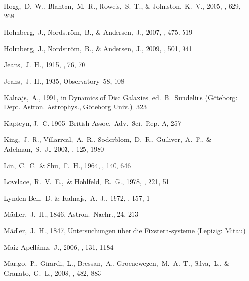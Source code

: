 \begin{thebibliography}{99}
  Hogg,~D.~W., Blanton,~M.~R., Roweis,~S.~T., \& Johnston,~K.~V., 2005,
  \apj, 629, 268

  Holmberg,~J., Nordstr\"{o}m,~B., \& Andersen,~J., 2007,
  \aap, 475, 519

  Holmberg,~J., Nordstr\"{o}m,~B., \& Andersen,~J., 2009,
  \aap, 501, 941

  Jeans,~J.~H., 1915,
  \mnras, 76, 70

  Jeans,~J.~H., 1935,
  Observatory, 58, 108

  Kalnajs,~A., 1991, in Dynamics of Disc Galaxies, ed.~B.~Sundelius (G\"{o}teborg: Dept. Astron. Astrophys., G\"{o}teborg Univ.), 323

{Kapteyn}, J.~C. 1905, {British Assoc.~Adv.~Sci.~Rep.} A, 257

  King,~J.~R., Villarreal,~A.~R., Soderblom,~D.~R., Gulliver,~A.~F., \& Adelman,~S.~J., 2003,
  \aj, 125, 1980

  Lin,~C.~C.~\& Shu,~F.~H., 1964,
  \apj, 140, 646

  Lovelace,~R.~V.~E.,~\& Hohlfeld,~R.~G., 1978,
  \apj, 221, 51

  Lynden-Bell,~D. \& Kalnajs,~A.~J., 1972,
  \mnras, 157, 1

  M\"{a}dler,~J.~H., 1846, Astron.~Nachr., 24, 213

  M\"{a}dler,~J.~H., 1847, Untersuchungen \"{u}ber die Fixstern-systeme (Lepizig: Mitau)

  Ma{\'{\i}}z Apell{\'a}niz,~J., 2006,
  \aj, 131, 1184

  Marigo,~P., Girardi,~L., Bressan,~A., Groenewegen,~M.~A.~T., Silva,~L., \& Granato,~G.~L., 2008,
  \aap, 482, 883


\end{thebibliography}
